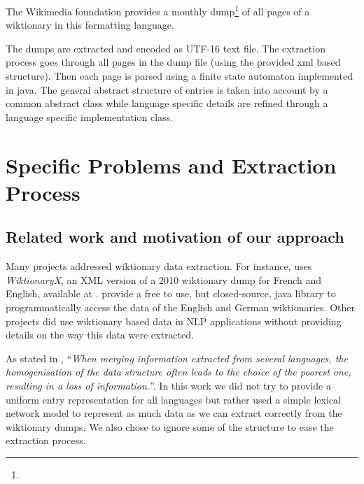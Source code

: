 \documentclass[10pt, a4paper]{article}
\newcommand{\mytexttt}[1]{\texttt{\textscale{0.9}{#1}}}
\begin{document}
The Wikimedia foundation provides a monthly dump\footnote{\mytexttt{http://dumps.wikimedia.org/}} of all pages of a wiktionary in this formatting language.

The dumps are extracted and encoded as UTF-16 text file. The extraction process goes through all pages in the dump file (using the provided xml based structure). Then each page is parsed using a finite state automaton implemented in java. The general abstract structure of entries is taken into account by a common abstract class while language specific details are refined through a language specific implementation class.

\section{Specific Problems and Extraction Process}

\subsection{Related work and motivation of our approach}

Many projects addressed wiktionary data extraction. For instance, \cite{sajous-EtAl-IceTAL2010} uses \emph{WiktionaryX}, an XML version of a 2010 wiktionary dump for French and English, available at \cite{WiktionaryX}. \cite{ZeschMuellerGurevych2008} provide a free to use, but closed-source, java library to programmatically access the data of the English and German wiktionaries. Other projects did use wiktionary based data in NLP applications without providing details on the way this data were extracted.

As stated in \cite{sajous-EtAl-IceTAL2010}, ``\emph{When merging information extracted from several languages, the homogenisation of the data structure often leads to the choice of the poorest one, resulting in a loss of information.}''. In this work we did not try to provide a uniform entry representation for all languages but rather used a simple lexical network model to represent as much data as we can extract correctly from the wiktionary dumps. We also chose to ignore some of the structure to ease the extraction process.
\end{document}

